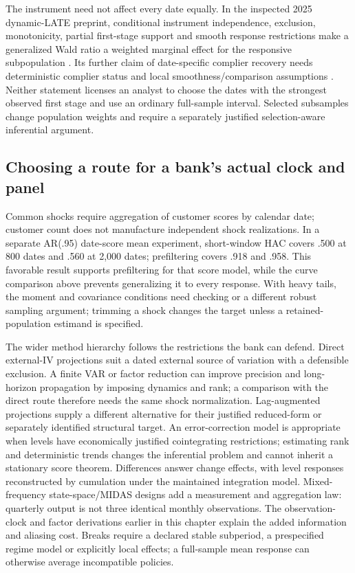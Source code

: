 The instrument need not affect every date equally. In the inspected 2025
dynamic-LATE preprint, conditional instrument independence, exclusion,
monotonicity, partial first-stage support and smooth response restrictions
make a generalized Wald ratio a weighted marginal effect for the responsive
subpopulation \citep[Assumptions 2.1--2.5 and Proposition 2.1]{casini2025}.
Its further claim of date-specific complier recovery needs deterministic
complier status and local smoothness/comparison assumptions
\citep[Assumptions 2.6--2.8]{casini2025}. Neither statement licenses an
analyst to choose the dates with the strongest observed first stage and use
an ordinary full-sample interval. Selected subsamples change population
weights and require a separately justified selection-aware inferential argument.

\subsection{Choosing a route for a bank's actual clock and panel}
Common shocks require aggregation of customer scores by calendar date;
customer count does not manufacture independent shock realizations. In a
separate AR(.95) date-score mean experiment, short-window HAC covers .500
at 800 dates and .560 at 2,000 dates; prefiltering covers .918 and .958.
This favorable result supports prefiltering for that score model, while
the curve comparison above prevents generalizing it to every response.
With heavy tails, the moment and covariance conditions need checking or a
different robust sampling argument; trimming a shock changes the target
unless a retained-population estimand is specified.

The wider method hierarchy follows the restrictions the bank can defend.
Direct external-IV projections suit a dated external source of variation
with a defensible exclusion. A finite VAR or factor reduction can improve
precision and long-horizon propagation by imposing dynamics and rank; a
comparison with the direct route therefore needs the same shock normalization.
Lag-augmented projections supply a different alternative for their justified
reduced-form or separately identified structural target. An error-correction model is appropriate when levels have
economically justified cointegrating restrictions; estimating rank and
deterministic trends changes the inferential problem and cannot inherit a
stationary score theorem. Differences answer change effects, with level
responses reconstructed by cumulation under the maintained integration
model. Mixed-frequency state-space/MIDAS designs add a measurement and
aggregation law: quarterly output is not three identical monthly observations.
The observation-clock and factor derivations earlier in this chapter explain
the added information and aliasing cost. Breaks require a declared stable
subperiod, a prespecified regime model or explicitly local effects; a
full-sample mean response can otherwise average incompatible policies.

